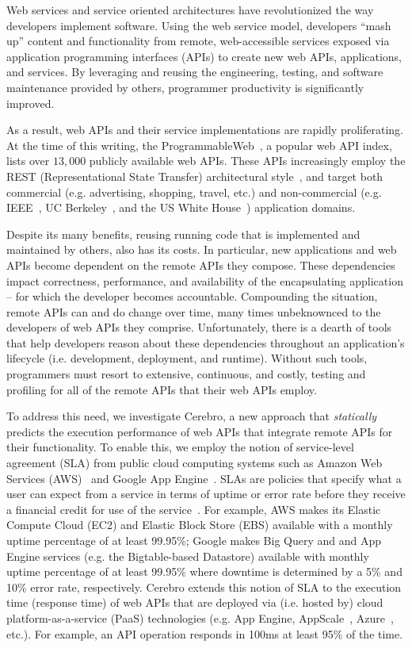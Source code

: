Web services and service oriented architectures have
revolutionized the way developers implement software.
Using the web service model, developers ``mash up'' content and functionality 
from remote, web-accessible services exposed via application programming interfaces (APIs)
to create new web APIs, applications, and services.  By leveraging and reusing the 
engineering, testing, and software maintenance provided by others, programmer
productivity is significantly improved.

As a result, web APIs and their service implementations are rapidly 
proliferating.  At the time of this writing, 
the ProgrammableWeb~\cite{pweb}, a popular web API index, lists over $13,000$
publicly available web APIs.
These APIs increasingly employ the REST (Representational State Transfer) 
architectural style~\cite{Fielding:2000:ASD:932295}, and target both
commercial (e.g. advertising, shopping, travel, etc.) and non-commercial
(e.g. IEEE~\cite{ieeeapis}, UC Berkeley~\cite{ucbapis}, and the US White
House~\cite{whitehouseapis}) application domains.

Despite its many benefits, reusing running code that is implemented
and maintained by others, also has its costs.  
In particular, new applications and web APIs become dependent on the 
remote APIs they compose.  These dependencies
impact correctness, performance, and availability of the encapsulating 
application -- for which the developer becomes accountable.  
Compounding the situation, remote APIs can and do change over time, many times
unbeknownced to the developers of web APIs they comprise.
Unfortunately, there is a dearth of tools that help developers reason about these 
dependencies throughout an application's 
lifecycle (i.e. development, deployment, and runtime).  Without such tools, 
programmers must resort to extensive, continuous, and costly, testing and profiling 
for all of the remote APIs that their web APIs employ.

To address this need, we investigate Cerebro, a new approach that
\textit{statically} predicts the execution performance of web APIs that 
integrate remote APIs for their functionality.
To enable this, we employ the notion of service-level agreement (SLA) from 
public cloud computing systems such as Amazon Web Services (AWS)~\cite{amazon-aws-web} and 
Google App Engine~\cite{gae}.  SLAs are policies that specify
what a user can expect from a service in terms of uptime or error rate
before they receive a financial credit for
use of the service~\cite{aws-ec2-sla,aws-s3-sla,aws-rds-sla,gae-sla,gcs-sla}.
For example, AWS makes its Elastic Compute Cloud (EC2) and Elastic Block Store (EBS) 
available with a monthly uptime percentage 
of at least 99.95\%; Google makes Big Query and and App Engine services (e.g. the 
Bigtable-based Datastore) available with monthly uptime percentage of at least 
99.95\% where downtime is determined by a 5\% and 10\% error rate, respectively.
Cerebro extends this notion of SLA to the execution time (response time) 
of web APIs that are deployed via (i.e. hosted by)
cloud platform-as-a-service (PaaS) technologies (e.g. App Engine, 
AppScale~\cite{6488671}, Azure~\cite{azure-web}, etc.).
For example, an API operation responds in 100ms at least 95\% of the time.

